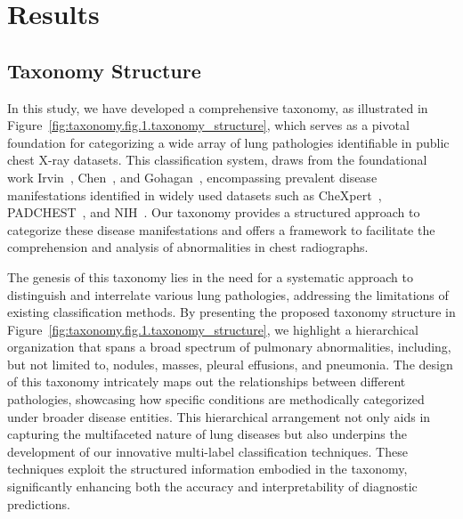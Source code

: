 \documentclass[review,1p,times,numbers]{elsarticle}
\begin{document}
\section{Results}\label{sec:taxonomy.results}
\subsection{Taxonomy Structure}
In this study, we have developed a comprehensive taxonomy, as illustrated in Figure~\ref{fig:taxonomy.fig.1.taxonomy_structure}, which serves as a pivotal foundation for categorizing a wide array of lung pathologies identifiable in public chest X-ray datasets. This classification system, draws from the foundational work Irvin~\cite{irvin_CheXpert_2019}, Chen~\cite{chen_Deep_2020}, and Gohagan~\cite{gohagan_Prostate_2000}, encompassing prevalent disease manifestations identified in widely used datasets such as CheXpert~\cite{irvin_CheXpert_2019}, PADCHEST~\cite{bustos_Padchest_2020}, and NIH~\cite{wang_ChestXRay8_2017}. Our taxonomy provides a structured approach to categorize these disease manifestations and offers a framework to facilitate the comprehension and analysis of abnormalities in chest radiographs.

The genesis of this taxonomy lies in the need for a systematic approach to distinguish and interrelate various lung pathologies, addressing the limitations of existing classification methods. By presenting the proposed taxonomy structure in Figure~\ref{fig:taxonomy.fig.1.taxonomy_structure}, we highlight a hierarchical organization that spans a broad spectrum of pulmonary abnormalities, including, but not limited to, nodules, masses, pleural effusions, and pneumonia. The design of this taxonomy intricately maps out the relationships between different pathologies, showcasing how specific conditions are methodically categorized under broader disease entities. This hierarchical arrangement not only aids in capturing the multifaceted nature of lung diseases but also underpins the development of our innovative multi-label classification techniques. These techniques exploit the structured information embodied in the taxonomy, significantly enhancing both the accuracy and interpretability of diagnostic predictions.
\end{document}
